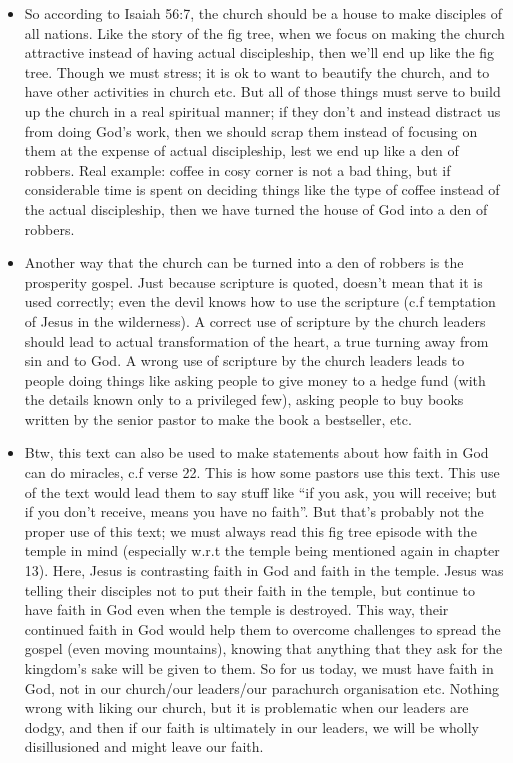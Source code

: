 \begin{itemize}
{  neglected the Isaiah verse w.r.t Gentiles, and focused on the business side
  of things to line their own pockets.}
  \item{So according to Isaiah 56:7, the church should be a house to make
  disciples of all nations.  Like the story of the fig tree, when we focus on
  making the church attractive instead of having actual discipleship, then
  we'll end up like the fig tree.  Though we must stress; it is ok to want to
  beautify the church, and to have other activities in church etc.  But all
  of those things must serve to build up the church in a real spiritual
  manner; if they don't and instead distract us from doing God's work, then
  we should scrap them instead of focusing on them at the expense of actual
  discipleship, lest we end up like a den of robbers.  Real example: coffee
  in cosy corner is not a bad thing, but if considerable time is spent on
  deciding things like the type of coffee instead of the actual discipleship,
  then we have turned the house of God into a den of robbers.}
  \item{Another way that the church can be turned into a den of robbers is
  the prosperity gospel.  Just because scripture is quoted, doesn't mean that
  it is used correctly; even the devil knows how to use the scripture (c.f
  temptation of Jesus in the wilderness).  A correct use of scripture by the
  church leaders should lead to actual transformation of the heart, a true
  turning away from sin and to God.  A wrong use of scripture by the church
  leaders leads to people doing things like asking people to give money to a
  hedge fund (with the details known only to a privileged few), asking people
  to buy books written by the senior pastor to make the book a bestseller,
  etc.}
  \item{Btw, this text can also be used to make statements about how faith in
  God can do miracles, c.f verse 22.  This is how some pastors use this text.
  This use of the text would lead them to say stuff like ``if you ask, you
  will receive; but if you don't receive, means you have no faith''.  But
  that's probably not the proper use of this text; we must always read this
  fig tree episode with the temple in mind (especially w.r.t the temple being
  mentioned again in chapter 13).  Here, Jesus is contrasting faith in God
  and faith in the temple.  Jesus was telling their disciples not to put
  their faith in the temple, but continue to have faith in God even when the
  temple is destroyed.  This way, their continued faith in God would help
  them to overcome challenges to spread the gospel (even moving mountains),
  knowing that anything that they ask for the kingdom's sake will be given to
  them.  So for us today, we must have faith in God, not in our church/our
  leaders/our parachurch organisation etc.  Nothing wrong with liking our
  church, but it is problematic when our leaders are dodgy, and then if our
  faith is ultimately in our leaders, we will be wholly disillusioned and
  might leave our faith.}
\end{itemize}